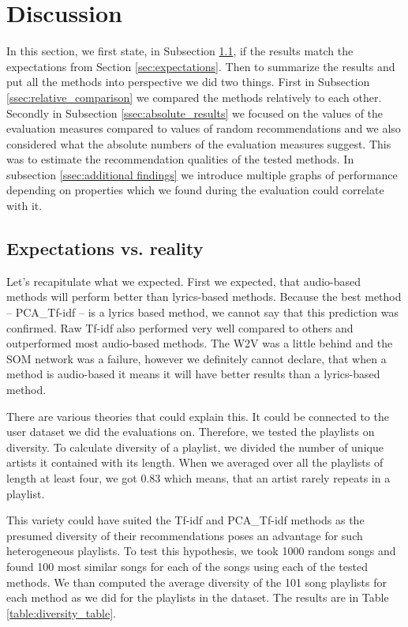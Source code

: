 \section{Discussion}\label{sec:discussion}
In this section, we first state, in Subsection \ref{ssec:exp_vs_reality}, 
if the results match the expectations from Section \ref{sec:expectations}. Then to summarize the results and put all the 
methods into perspective we did two things. First in Subsection 
\ref{ssec:relative_comparison} we compared the methods relatively to each 
other. Secondly in Subsection \ref{ssec:absolute_results} we focused on the 
values of the evaluation measures compared to values of random recommendations and we also considered what the absolute numbers of the evaluation measures suggest. This was to estimate the recommendation qualities of the tested methods. In subsection \ref{ssec:additional findings} we introduce multiple graphs of performance depending on properties which we found during the evaluation could correlate with it. 

\subsection{Expectations vs. reality}\label{ssec:exp_vs_reality}
Let's recapitulate what we expected. First we expected, that audio-based methods will perform better than lyrics-based methods. Because the best
method -- PCA\_Tf-idf -- is a lyrics based method, we cannot say that this 
prediction was confirmed. Raw Tf-idf also performed very well compared to 
others and outperformed most audio-based methods.  The W2V was a little 
behind and the SOM network was a failure, however we definitely cannot declare,
that when a method is audio-based it means it will have better results than a lyrics-based method.

There are various theories that could explain this. It could be connected to the user dataset we did the evaluations on. Therefore, we tested the playlists on 
diversity. To calculate diversity of a playlist, we divided the number of unique artists it contained with its length. When we averaged over all the playlists of length at least four, we got 0.83 which means, that an 
artist rarely repeats in a playlist. 

This variety could have suited the 
Tf-idf and PCA\_Tf-idf methods as the presumed diversity of their recommendations poses 
an advantage for such heterogeneous playlists. To test this hypothesis, we 
took 1000 random songs and found 100 most similar songs for each of the songs using each of the tested methods. We than computed the average diversity of the 101 song playlists for each method as we did for the playlists in the dataset. The results are in Table \ref{table:diversity_table}.

